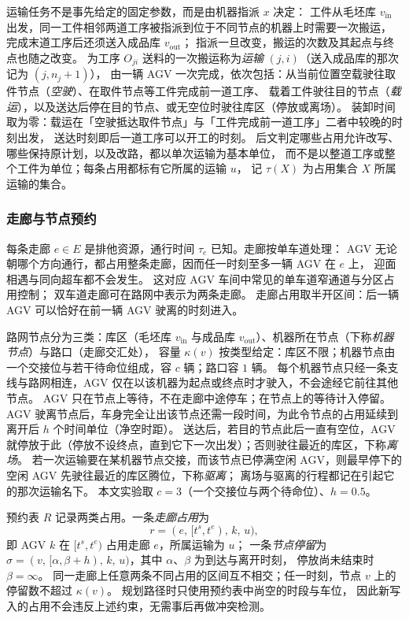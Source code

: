 \documentclass[manuscript,screen,review]{acmart}
\begin{document}
运输任务不是事先给定的固定参数，而是由机器指派 \(x\) 决定：
工件从毛坯库 \(v_{\mathrm{in}}\) 出发，同一工件相邻两道工序被指派到位于不同节点的机器上时需要一次搬运，
完成末道工序后还须送入成品库 \(v_{\mathrm{out}}\)；
指派一旦改变，搬运的次数及其起点与终点也随之改变。
为工序 \(O_{ji}\) 送料的一次搬运称为\emph{运输} \((j,i)\)（送入成品库的那次记为 \((j,n_j+1)\)），
由一辆 AGV 一次完成，依次包括：从当前位置空载驶往取件节点（\emph{空驶}）、在取件节点等工件完成前一道工序、
载着工件驶往目的节点（\emph{载运}），以及送达后停在目的节点、或无空位时驶往库区（停放或离场）。
装卸时间取为零：载运在「空驶抵达取件节点」与「工件完成前一道工序」二者中较晚的时刻出发，
送达时刻即后一道工序可以开工的时刻。
后文判定哪些占用允许改写、哪些保持原计划，以及改路，都以单次运输为基本单位，
而不是以整道工序或整个工件为单位；每条占用都标有它所属的运输 \(u\)，
记 \(\tau(X)\) 为占用集合 \(X\) 所属运输的集合。

\subsubsection{走廊与节点预约}
\label{sec:reservation}

每条走廊 \(e\in E\) 是排他资源，通行时间 \(\tau_e\) 已知。走廊按单车道处理：
AGV 无论朝哪个方向通行，都占用整条走廊，因而任一时刻至多一辆 AGV 在 \(e\) 上，
迎面相遇与同向超车都不会发生。
这对应 AGV 车间中常见的单车道窄通道与分区占用控制；
双车道走廊可在路网中表示为两条走廊。
走廊占用取半开区间：后一辆 AGV 可以恰好在前一辆 AGV 驶离的时刻进入。

路网节点分为三类：库区（毛坯库 \(v_{\mathrm{in}}\) 与成品库 \(v_{\mathrm{out}}\)）、机器所在节点（下称\emph{机器节点}）与路口（走廊交汇处），
容量 \(\kappa(v)\) 按类型给定：库区不限；机器节点由一个交接位与若干待命位组成，容 \(c\) 辆；路口容 \(1\) 辆。
每个机器节点只经一条支线与路网相连，AGV 仅在以该机器为起点或终点时才驶入，不会途经它前往其他节点。
AGV 只在节点上等待，不在走廊中途停车；在节点上的等待计入停留。
AGV 驶离节点后，车身完全让出该节点还需一段时间，为此令节点的占用延续到离开后 \(h\) 个时间单位（净空时距）。
送达后，若目的节点此后一直有空位，AGV 就停放于此（停放不设终点，直到它下一次出发）；否则驶往最近的库区，下称\emph{离场}。
若一次运输要在某机器节点交接，而该节点已停满空闲 AGV，则最早停下的空闲 AGV 先驶往最近的库区腾位，下称\emph{驱离}；
离场与驱离的行程都记在引起它的那次运输名下。
本文实验取 \(c=3\)（一个交接位与两个待命位）、\(h=0.5\)。

预约表 \(R\) 记录两类占用。一条\emph{走廊占用}为
\[
r=(e,\,[t^s,t^e),\,k,\,u),
\]
即 AGV \(k\) 在 \([t^s,t^e)\) 占用走廊 \(e\)，所属运输为 \(u\)；
一条\emph{节点停留}为 \(\sigma=(v,\,[\alpha,\beta+h),\,k,\,u)\)，其中 \(\alpha\)、\(\beta\) 为到达与离开时刻，
停放尚未结束时 \(\beta=\infty\)。
同一走廊上任意两条不同占用的区间互不相交；任一时刻，节点 \(v\) 上的停留数不超过 \(\kappa(v)\)。
规划路径时只使用预约表中尚空的时段与车位，
因此新写入的占用不会违反上述约束，无需事后再做冲突检测。
\end{document}
